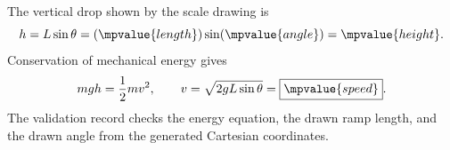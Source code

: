 The vertical drop shown by the scale drawing is
\[
  h=L\sin\theta=(\mpvalue{length})\sin(\mpvalue{angle})=\mpvalue{height}.
\]
Conservation of mechanical energy gives
\[
  mg h=\frac12mv^2,
  \qquad
  v=\sqrt{2gL\sin\theta}=\boxed{\mpvalue{speed}}.
\]
The validation record checks the energy equation, the drawn ramp length, and the drawn angle from
the generated Cartesian coordinates.
